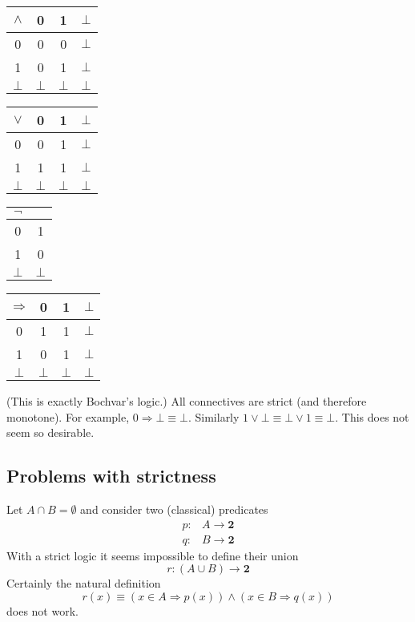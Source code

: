 \documentclass{llncs}
\newcommand{\fun}{\rightarrow}
\newcommand{\impl}{\mathbin{\Rightarrow}}
\newcommand{\Bool}{\mathbf{2}}
\begin{document}
\begin{center}
\begin{tabular}{|c|ccc|}
\hline
   $\land$& 0 & 1 & $\bot$
\\ \hline
   0      & 0 & 0 & $\bot$
\\ 1      & 0 & 1 & $\bot$
\\ $\bot$ & $\bot$ & $\bot$ & $\bot$
\\ \hline
\end{tabular}
\hfil
\begin{tabular}{|c|ccc|}
\hline
   $\lor$ & 0 & 1 & $\bot$
\\ \hline
   0      & 0 & 1 & $\bot$
\\ 1      & 1 & 1 & $\bot$
\\ $\bot$ & $\bot$ & $\bot$ & $\bot$
\\ \hline
\end{tabular}
\hfil
\begin{tabular}{|c|c|}
\hline
   $\neg$ &
\\ \hline
   0      & 1
\\ 1      & 0
\\ $\bot$ & $\bot$
\\ \hline
\end{tabular}
\hfil
\begin{tabular}{|c|ccc|}
\hline
   $\impl$ & 0 & 1 & $\bot$
\\ \hline
   0      & 1 & 1 & $\bot$
\\ 1      & 0 & 1 & $\bot$
\\ $\bot$ & $\bot$ & $\bot$ & $\bot$
\\ \hline
\end{tabular}
\end{center}
%
(This is exactly Bochvar's logic.)
All connectives are strict (and therefore monotone).
For example, $0 \impl \bot \equiv \bot$.
Similarly $1 \lor \bot \equiv \bot \lor 1 \equiv \bot$.
This does not seem so desirable.


\subsection{Problems with strictness}

Let $A \cap B = \emptyset$ and consider two (classical) predicates
\[
  \begin{array}{ll}
     p : & A \fun \Bool
  \\ q : & B \fun \Bool
  \end{array}
\]
With a strict logic it seems impossible to define their union
\[
  r : (A \cup B) \fun \Bool
\]
Certainly the natural definition
\[
  r(x) \equiv (x \in A \impl p(x)) \land (x \in B \impl q(x))
\]
does not work.
\end{document}
